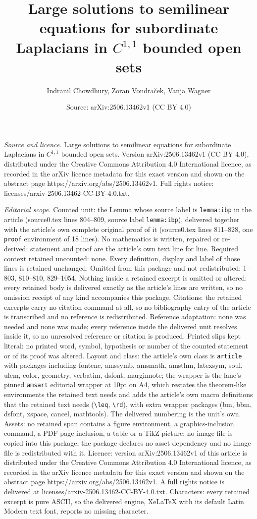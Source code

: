 \documentclass[10pt,a4paper]{amsart}
\title[Large solutions to semilinear equations for subordinate Lapl]{Large solutions to semilinear equations for subordinate Laplacians in $C^{1,1}$ bounded open sets}
\author{Indranil Chowdhury, Zoran Vondra\v{c}ek, Vanja Wagner}
\date{Source: arXiv:2506.13462v1 (CC BY 4.0)}
\begin{document}
\maketitle

\noindent\emph{Source and licence.} Large solutions to semilinear equations for subordinate Laplacians in $C^{1,1}$ bounded open sets. Version arXiv:2506.13462v1 (CC BY 4.0), distributed under the Creative Commons Attribution 4.0 International licence, as recorded in the arXiv licence metadata for this exact version and shown on the abstract page https://arxiv.org/abs/2506.13462v1. Full rights notice: licenses/arxiv-2506.13462-CC-BY-4.0.txt.\par\smallskip

\noindent\textit{Editorial scope.} Counted unit: the Lemma whose source label is \texttt{lemma:ibp} in the article (source0.tex lines 804--809, source label \texttt{lemma:ibp}), delivered together with the article's own complete original proof of it (source0.tex lines 811--828, one \texttt{proof} environment of 18 lines). No mathematics is written, repaired or re-derived: statement and proof are the article's own text line for line. Required context retained uncounted: none. Every definition, display and label of those lines is retained unchanged. Omitted from this package and not redistributed: 1--803, 810--810, 829--1054. Nothing inside a retained excerpt is omitted or altered: every retained body is delivered exactly as the article's lines are written, so no omission receipt of any kind accompanies this package. Citations: the retained excerpts carry no citation command at all, so no bibliography entry of the article is transcribed and no reference is redistributed. Reference adaptation: none was needed and none was made; every reference inside the delivered unit resolves inside it, so no unresolved reference or citation is produced. Printed slips kept literal: no printed word, symbol, hypothesis or number of the counted statement or of its proof was altered. Layout and class: the article's own class is \texttt{article} with packages including fontenc, amssymb, amsmath, amsthm, latexsym, soul, ulem, color, geometry, verbatim, dsfont, marginnote; the wrapper is the lane's pinned \texttt{amsart} editorial wrapper at 10pt on A4, which restates the theorem-like environments the retained text needs and adds the article's own macro definitions that the retained text needs (\texttt{\textbackslash leq}, \texttt{\textbackslash rd}), with extra wrapper packages (bm, bbm, dsfont, xspace, cancel, mathtools). The delivered numbering is the unit's own. Assets: no retained span contains a figure environment, a graphics-inclusion command, a PDF-page inclusion, a table or a TikZ picture; no image file is copied into this package, the package declares no asset dependency and no image file is redistributed with it. Licence: version arXiv:2506.13462v1 of this article is distributed under the Creative Commons Attribution 4.0 International licence, as recorded in the arXiv licence metadata for this exact version and shown on the abstract page https://arxiv.org/abs/2506.13462v1. A full rights notice is delivered at licenses/arxiv-2506.13462-CC-BY-4.0.txt. Characters: every retained excerpt is pure ASCII, so the delivered engine, XeLaTeX with its default Latin Modern text font, reports no missing character.
\end{document}
